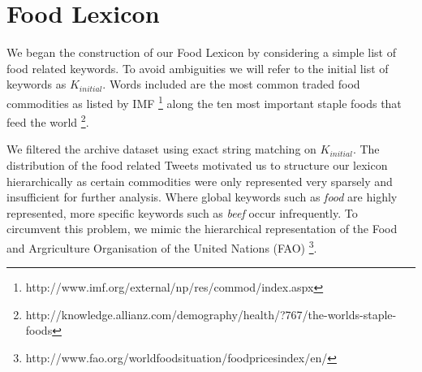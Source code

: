 \section{Food Lexicon}
\label{food_lex}

We began the construction of our Food Lexicon by considering  a simple list of food related keywords. To avoid ambiguities we will refer to the initial list of keywords as $K_{initial}$. Words included are the most common traded food commodities as listed by IMF \footnote{http://www.imf.org/external/np/res/commod/index.aspx} along the ten most important staple foods that feed the world \footnote{http://knowledge.allianz.com/demography/health/?767/the-worlds-staple-foods}. 

We filtered the archive dataset using exact string matching on $K_{initial}$. The distribution of the food related Tweets motivated us to structure our lexicon hierarchically as certain commodities were only represented very sparsely and insufficient for further analysis. Where global keywords such as \emph{food} are highly represented, more specific keywords such as \emph{beef} occur infrequently. To circumvent this problem, we mimic the hierarchical representation of the Food and Argriculture Organisation of the United Nations (FAO)  \footnote{http://www.fao.org/worldfoodsituation/foodpricesindex/en/}. 

